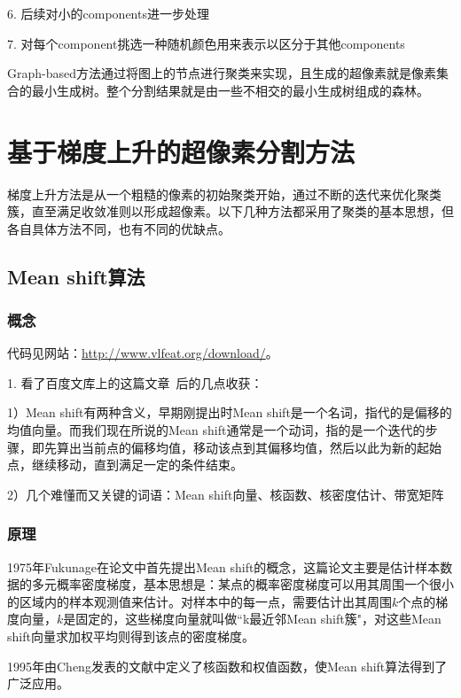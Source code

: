 \documentclass[12pt]{article}
\begin{document}
6. 后续对小的components进一步处理

7. 对每个component挑选一种随机颜色用来表示以区分于其他components

Graph-based方法通过将图上的节点进行聚类来实现，且生成的超像素就是像素集合的最小生成树。整个分割结果就是由一些不相交的最小生成树组成的森林。


\section{基于梯度上升的超像素分割方法}

梯度上升方法是从一个粗糙的像素的初始聚类开始，通过不断的迭代来优化聚类簇，直至满足收敛准则以形成超像素。以下几种方法都采用了聚类的基本思想，但各自具体方法不同，也有不同的优缺点。

\subsection{Mean shift算法}

\subsubsection{概念}

代码见网站：\url{http://www.vlfeat.org/download/}。

1. 看了百度文库上的这篇文章~\cite{MeanShiftIntroduction}后的几点收获：

1）Mean shift有两种含义，早期刚提出时Mean shift是一个名词，指代的是偏移的均值向量。而我们现在所说的Mean shift通常是一个动词，指的是一个迭代的步骤，即先算出当前点的偏移均值，移动该点到其偏移均值，然后以此为新的起始点，继续移动，直到满足一定的条件结束。

2）几个难懂而又关键的词语：Mean shift向量、核函数、核密度估计、带宽矩阵

\subsubsection{原理}

1975年Fukunage在论文\cite{fukunaga1975estimation}中首先提出Mean shift的概念，这篇论文主要是估计样本数据的多元概率密度梯度，基本思想是：某点的概率密度梯度可以用其周围一个很小的区域内的样本观测值来估计。对样本中的每一点，需要估计出其周围$k$个点的梯度向量，$k$是固定的，这些梯度向量就叫做“k最近邻Mean shift簇"，对这些Mean shift向量求加权平均则得到该点的密度梯度。

1995年由Cheng发表的文献中定义了核函数和权值函数，使Mean shift算法得到了广泛应用。
\end{document}
